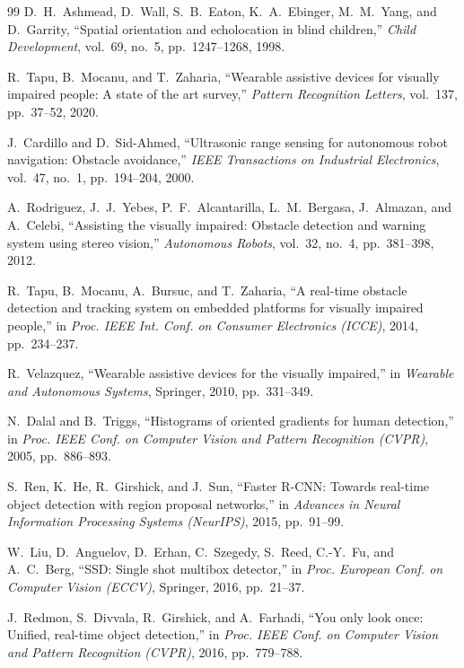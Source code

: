 \documentclass[10pt,twocolumn]{article}
\begin{document}
\begin{thebibliography}{99}
D.~H.~Ashmead, D.~Wall, S.~B.~Eaton, K.~A.~Ebinger, M.~M.~Yang, and D.~Garrity, ``Spatial orientation and echolocation in blind children,'' \emph{Child Development}, vol.~69, no.~5, pp.~1247--1268, 1998.

R.~Tapu, B.~Mocanu, and T.~Zaharia, ``Wearable assistive devices for visually impaired people: A state of the art survey,'' \emph{Pattern Recognition Letters}, vol.~137, pp.~37--52, 2020.

J.~Cardillo and D.~Sid-Ahmed, ``Ultrasonic range sensing for autonomous robot navigation: Obstacle avoidance,'' \emph{IEEE Transactions on Industrial Electronics}, vol.~47, no.~1, pp.~194--204, 2000.

A.~Rodriguez, J.~J.~Yebes, P.~F.~Alcantarilla, L.~M.~Bergasa, J.~Almazan, and A.~Celebi, ``Assisting the visually impaired: Obstacle detection and warning system using stereo vision,'' \emph{Autonomous Robots}, vol.~32, no.~4, pp.~381--398, 2012.

R.~Tapu, B.~Mocanu, A.~Bursuc, and T.~Zaharia, ``A real-time obstacle detection and tracking system on embedded platforms for visually impaired people,'' in \emph{Proc. IEEE Int. Conf. on Consumer Electronics (ICCE)}, 2014, pp.~234--237.

R.~Velazquez, ``Wearable assistive devices for the visually impaired,'' in \emph{Wearable and Autonomous Systems}, Springer, 2010, pp.~331--349.

N.~Dalal and B.~Triggs, ``Histograms of oriented gradients for human detection,'' in \emph{Proc. IEEE Conf. on Computer Vision and Pattern Recognition (CVPR)}, 2005, pp.~886--893.

S.~Ren, K.~He, R.~Girshick, and J.~Sun, ``Faster R-CNN: Towards real-time object detection with region proposal networks,'' in \emph{Advances in Neural Information Processing Systems (NeurIPS)}, 2015, pp.~91--99.

W.~Liu, D.~Anguelov, D.~Erhan, C.~Szegedy, S.~Reed, C.-Y.~Fu, and A.~C.~Berg, ``SSD: Single shot multibox detector,'' in \emph{Proc. European Conf. on Computer Vision (ECCV)}, Springer, 2016, pp.~21--37.

J.~Redmon, S.~Divvala, R.~Girshick, and A.~Farhadi, ``You only look once: Unified, real-time object detection,'' in \emph{Proc. IEEE Conf. on Computer Vision and Pattern Recognition (CVPR)}, 2016, pp.~779--788.


\end{thebibliography}
\end{document}
